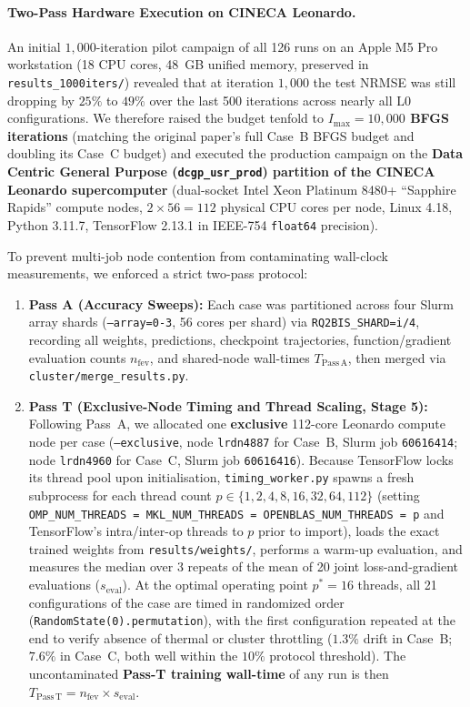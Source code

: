 \paragraph{Two-Pass Hardware Execution on CINECA Leonardo.}
An initial $1{,}000$-iteration pilot campaign of all 126 runs on an Apple M5 Pro workstation (18 CPU cores, 48~GB unified memory, preserved in \texttt{results\_1000iters/}) revealed that at iteration $1{,}000$ the test NRMSE was still dropping by $25\%$ to $49\%$ over the last 500 iterations across nearly all $\mathrm{L0}$ configurations. We therefore raised the budget tenfold to \textbf{$I_{\max} = 10{,}000$ BFGS iterations} (matching the original paper's full Case~B BFGS budget and doubling its Case~C budget) and executed the production campaign on the \textbf{Data Centric General Purpose (\texttt{dcgp\_usr\_prod}) partition of the CINECA Leonardo supercomputer} (dual-socket Intel Xeon Platinum 8480+ ``Sapphire Rapids'' compute nodes, $2 \times 56 = 112$ physical CPU cores per node, Linux 4.18, Python 3.11.7, TensorFlow 2.13.1 in IEEE-754 \texttt{float64} precision).

To prevent multi-job node contention from contaminating wall-clock measurements, we enforced a strict two-pass protocol:
\begin{enumerate}[leftmargin=2em]
  \item \textbf{Pass A (Accuracy Sweeps):} Each case was partitioned across four Slurm array shards (\texttt{--array=0-3}, 56 cores per shard) via \texttt{RQ2BIS\_SHARD=i/4}, recording all weights, predictions, checkpoint trajectories, function/gradient evaluation counts $n_{\mathrm{fev}}$, and shared-node wall-times $T_{\mathrm{Pass\,A}}$, then merged via \texttt{cluster/merge\_results.py}.
  \item \textbf{Pass T (Exclusive-Node Timing and Thread Scaling, Stage 5):} Following Pass~A, we allocated one \textbf{exclusive} 112-core Leonardo compute node per case (\texttt{--exclusive}, node \texttt{lrdn4887} for Case~B, Slurm job \texttt{60616414}; node \texttt{lrdn4960} for Case~C, Slurm job \texttt{60616416}). Because TensorFlow locks its thread pool upon initialisation, \texttt{timing\_worker.py} spawns a fresh subprocess for each thread count $p \in \{1, 2, 4, 8, 16, 32, 64, 112\}$ (setting \texttt{OMP\_NUM\_THREADS = MKL\_NUM\_THREADS = OPENBLAS\_NUM\_THREADS = p} and TensorFlow's intra/inter-op threads to $p$ prior to import), loads the exact trained weights from \texttt{results/weights/}, performs a warm-up evaluation, and measures the median over 3 repeats of the mean of 20 joint loss-and-gradient evaluations ($s_{\mathrm{eval}}$). At the optimal operating point $p^* = 16$ threads, all 21 configurations of the case are timed in randomized order (\texttt{RandomState(0).permutation}), with the first configuration repeated at the end to verify absence of thermal or cluster throttling ($1.3\%$ drift in Case~B; $7.6\%$ in Case~C, both well within the $10\%$ protocol threshold). The uncontaminated \textbf{Pass-T training wall-time} of any run is then $T_{\mathrm{Pass\,T}} = n_{\mathrm{fev}} \times s_{\mathrm{eval}}$.
\end{enumerate}

